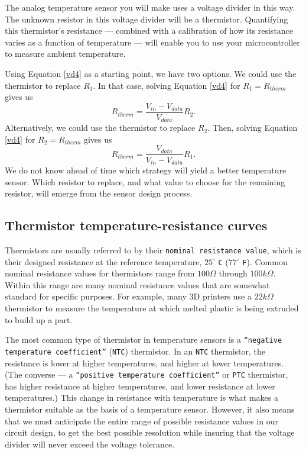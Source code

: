 The analog temperature sensor you will make uses a voltage divider in this way.
The unknown resistor in this voltage divider will be a thermistor.
Quantifying this thermistor's resistance --- combined with a calibration of how its resistance varies as a function of temperature --- will enable you to use your microcontroller to measure ambient temperature.

Using Equation \ref{vd4} as a starting point, we have two options.
We could use the thermistor to replace $R_1$.
In that case, solving Equation \ref{vd4} for $R_1 = R_{therm}$ gives us
\begin{equation}\label{therm1}
R_{therm} = \frac{V_{in}-V_{data}}{V_{data}}R_2.
\end{equation}
Alternatively, we could use the thermistor to replace $R_2$.
Then, solving Equation \ref{vd4} for $R_2 = R_{therm}$ gives us
\begin{equation}\label{therm2}
R_{therm} = \frac{V_{data}}{V_{in}-V_{data}}R_1.
\end{equation}
We do not know ahead of time which strategy will yield a better temperature sensor.
Which resistor to replace, and what value to choose for the remaining resistor, will emerge from the sensor design process.

\subsection{Thermistor temperature-resistance curves}
Thermistors are usually referred to by their \texttt{nominal resistance value}, which is their designed resistance at the reference temperature, $25^\circ$ \texttt{C} ($77^\circ$ \texttt{F}).
Common nominal resistance values for thermistors range from $100\Omega$ through $100k\Omega$.
Within this range are many nominal resistance values that are somewhat standard for specific purposes.
For example, many 3D printers use a $22k\Omega$ thermistor to measure the temperature at which melted plastic is being extruded to build up a part.

The most common type of thermistor in temperature sensors is a \texttt{``negative temperature coefficient''} (\texttt{NTC}) thermistor.
In an \texttt{NTC} thermistor, the resistance is lower at higher temperatures, and higher at lower temperatures.
(The converse --- a \texttt{``positive temperature coefficient''} or \texttt{PTC} thermistor, has higher resistance at higher temperatures, and lower resistance at lower temperatures.)
This change in resistance with temperature is what makes a thermistor suitable as the basis of a temperature sensor.
However, it also means that we must anticipate the entire range of possible resistance values in our circuit design, to get the best possible resolution while insuring that the voltage divider will never exceed the \adc voltage tolerance.

